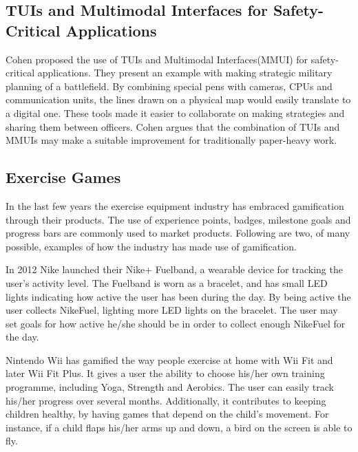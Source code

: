 \subsection{TUIs and Multimodal Interfaces for Safety-Critical Applications}
\label{sec:militaryuseoftui}
Cohen \etal{} proposed the use of TUIs and Multimodal Interfaces(MMUI) for safety-critical applications\cite{cohen2004tangible}. They present an example with making strategic military planning of a battlefield. By combining special pens with cameras, CPUs and communication units, the lines drawn on a physical map would easily translate to a digital one. These tools made it easier to collaborate on making strategies and sharing them between officers. Cohen \etal{} argues that the combination of TUIs and MMUIs may make a suitable improvement for traditionally paper-heavy work.

\subsection{Exercise Games}
\label{sec:exercisegames}
In the last few years the exercise equipment industry has embraced gamification through their products. The use of experience points, badges, milestone goals and progress bars are commonly used to market products. Following are two, of many possible, examples of how the industry has made use of gamification. 

In 2012 Nike launched their Nike+ Fuelband, a wearable device for tracking the user's activity level. The Fuelband is worn as a bracelet, and has small LED lights indicating how active the user has been during the day. By being active the user collects NikeFuel\texttrademark, lighting more LED lights on the bracelet. The user may set goals for how active he/she should be in order to collect enough NikeFuel for the day. 

Nintendo Wii has gamified the way people exercise at home with Wii Fit and later Wii Fit Plus. It gives a user the ability to choose his/her own training programme, including Yoga, Strength and Aerobics. The user can easily track his/her progress over several months. Additionally, it contributes to keeping children healthy, by having games that depend on the child's movement. For instance, if a child flaps his/her arms up and down, a bird on the screen is able to fly.
 